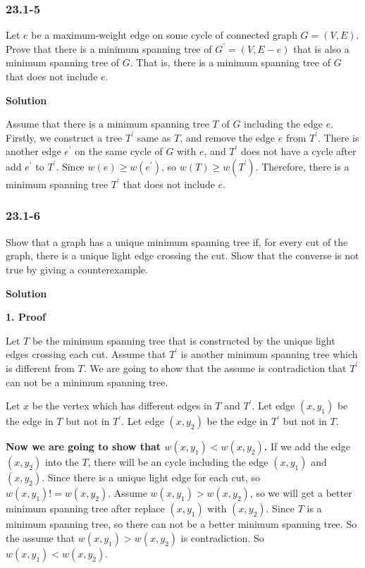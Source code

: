 \subsubsection {23.1-5}

Let $e$ be a maximum-weight edge on some cycle of connected graph $G = (V, E)$.
Prove that there is a minimum spanning tree of $G^{'} = (V, E - {e})$ that is
also a minimum spanning tree of $G$. That is, there is a minimum spanning tree
of $G$ that does not include $e$.

\textbf{Solution}

Assume that there is a minimum spanning tree $T$ of $G$ including the edge $e$.
Firstly, we construct a tree $T^{'}$ same as $T$, and remove the edge $e$ from
$T^{'}$. There is another edge $e^{'}$ on the same cycle of $G$ with $e$, and
$T^{'}$ does not have a cycle after add $e^{'}$ to $T^{'}$. Since
$w(e) \geq w(e^{'})$, so $w(T) \geq w(T^{'})$. Therefore, there is a minimum
spanning tree $T^{'}$ that does not include $e$.


\subsubsection {23.1-6}

Show that a graph has a unique minimum spanning tree if, for every cut of the
graph, there is a unique light edge crossing the cut. Show that the converse is
not true by giving a counterexample.

\textbf{Solution}

\textbf{1. Proof}

Let $T$ be the minimum spanning tree that is constructed by the unique light
edges crossing each cut. Assume that $T^{'}$ is another minimum spanning tree
which is different from $T$. We are going to show that the assume is
contradiction that $T^{'}$ can not be a minimum spanning tree.

Let $x$ be the vertex which has different edges in $T$ and $T^{'}$. Let edge
$(x, y_1)$ be the edge in $T$ but not in $T^{'}$. Let edge $(x, y_2)$ be the
edge in $T^{'}$ but not in $T$.

\textbf{Now we are going to show that $w(x, y_1) < w(x, y_2)$.} If we add the edge
$(x, y_2)$ into the $T$, there will be an cycle including the edge $(x, y_1)$
and $(x, y_2)$. Since there is a unique light edge for each cut, so
$w(x, y_1) != w(x, y_2)$. Assume $w(x, y_1) > w(x, y_2)$, so we will get a
better minimum spanning tree after replace $(x, y_1)$ with $(x, y_2)$. Since
$T$ is a minimum spanning tree, so there can not be a better minimum spanning
tree. So the assume that $w(x, y_1) > w(x, y_2)$ is contradiction. So
$w(x, y_1) < w(x, y_2)$.

